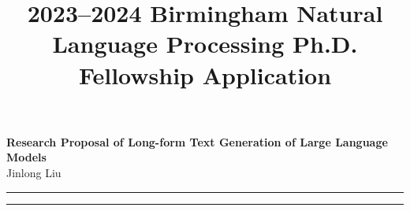 \documentclass[10pt]{article}
\author{}
\title{2023--2024 Birmingham Natural Language Processing Ph.D. Fellowship Application}
\begin{document}
\renewcommand{\thesection}{\Roman{section}}
	
	\begin{center}
		{\Large \textbf{Research Proposal of Long-form Text Generation of Large Language Models}}\\
		\vspace{1em}
		{\large Jinlong Liu}\\
		\vspace{1em}
	\end{center}

	\begin{center}
		\rule{150mm}{0.2mm}
	\end{center}	
	
	\begin{abstract}
	
		
	\end{abstract}

	\begin{center}
		\rule{150mm}{0.2mm}
	\end{center}	

	\vspace{5mm}
\end{document}
